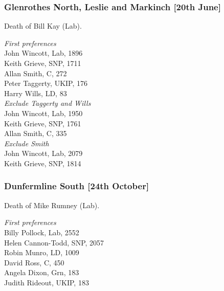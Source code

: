 \documentclass[a4paper,openany,10pt]{book}
\begin{document}
\subsubsection*{Glenrothes North, Leslie and Markinch \hspace*{\fill}\nolinebreak[1]%
\enspace\hspace*{\fill}
[20th June]}


Death of Bill Kay (Lab).



\emph{First preferences}\\
John Wincott, Lab, 1896\\
Keith Grieve, SNP, 1711\\
Allan Smith, C, 272\\
Peter Taggerty, UKIP, 176\\
Harry Wills, LD, 83\\




\emph{Exclude Taggerty and Wills}\\
John Wincott, Lab, 1950\\
Keith Grieve, SNP, 1761\\
Allan Smith, C, 335\\




\emph{Exclude Smith}\\
John Wincott, Lab, 2079\\
Keith Grieve, SNP, 1814\\


\subsubsection*{Dunfermline South \hspace*{\fill}\nolinebreak[1]%
\enspace\hspace*{\fill}
[24th October]}


Death of Mike Rumney (Lab).



\emph{First preferences}\\
Billy Pollock, Lab, 2552\\
Helen Cannon-Todd, SNP, 2057\\
Robin Munro, LD, 1009\\
David Ross, C, 450\\
Angela Dixon, Grn, 183\\
Judith Rideout, UKIP, 183\\
\end{document}
